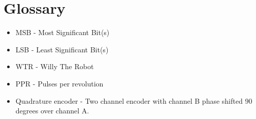 \section{Glossary}
\begin{itemize}
\item \label{trm::MSB} MSB  - Most Significant Bit(s)
\item \label{trm::LSB} LSB  - Least Significant Bit(s)
\item \label{trm::WTR} WTR  - Willy The Robot
\item \label{trm::PPR} PPR - Pulses per revolution
\item \label{trm::quad} Quadrature encoder - Two channel encoder with channel B phase shifted 90 degrees over channel A.
\end{itemize}